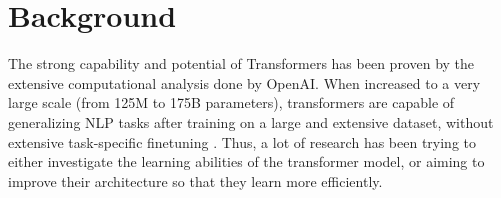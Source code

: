 \documentclass{article}
\begin{document}

\section{Background}
\noindent
The strong capability and potential of Transformers has been proven by the extensive computational analysis done by OpenAI. When increased to a very large scale (from 125M to 175B parameters), transformers are capable of generalizing NLP tasks after training on a large and extensive dataset, without extensive task-specific finetuning \cite{gpt3}. Thus, a lot of research has been trying to either investigate the learning abilities of the transformer model, or aiming to improve their architecture so that they learn more efficiently.
\end{document}
